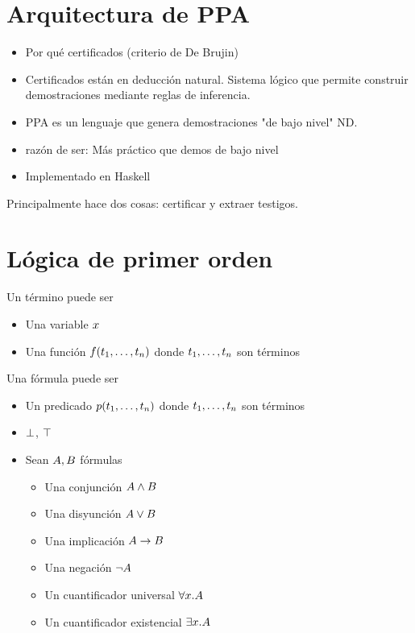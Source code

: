 \section{Arquitectura de PPA}

\begin{itemize}
    \item Por qué certificados (criterio de De Brujin)
    \item Certificados están en deducción natural. Sistema lógico que permite
    construir demostraciones mediante reglas de inferencia.
    \item PPA es un lenguaje que genera demostraciones "de bajo nivel" ND.
    \item razón de ser: Más práctico que demos de bajo nivel
    \item Implementado en Haskell
\end{itemize}

Principalmente hace dos cosas: certificar y extraer testigos.

\section{Lógica de primer orden}

\begin{definition}[Términos]
    Un término puede ser
    \begin{itemize}
        \item Una variable $x$
        \item Una función $f(t_1, \dots, t_n)$ donde $t_1, \dots,
        t_n$ son términos
    \end{itemize}
\end{definition}

\begin{definition}[Fórmulas]
    Una fórmula puede ser
    \begin{itemize}
        \item Un predicado $p(t_1, \dots, t_n)$ donde $t_1, \dots,
        t_n$ son términos
        \item $\bot$, $\top$
        \item Sean $A, B$ fórmulas
        \begin{itemize}
            \item Una conjunción $A \wedge B$
            \item Una disyunción $A \vee B$
            \item Una implicación $A \to B$
            \item Una negación $\neg A$
            \item Un cuantificador universal $\forall x . A$
            \item Un cuantificador existencial $\exists x . A$
        \end{itemize}
    \end{itemize}
\end{definition}

